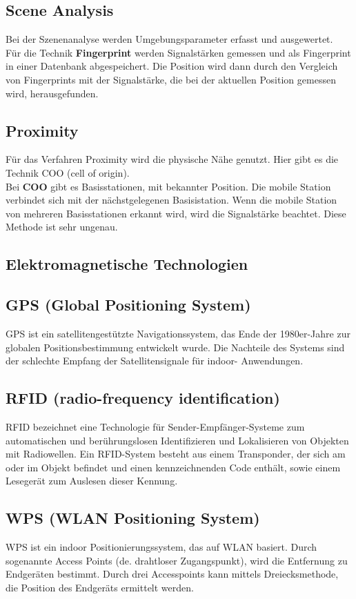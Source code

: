     \subsection*{Scene Analysis}
    Bei der Szenenanalyse werden Umgebungsparameter erfasst und ausgewertet.\\
    Für die Technik \textbf{Fingerprint} werden Signalstärken gemessen und als Fingerprint in einer Datenbank abgespeichert. Die Position wird dann durch den Vergleich von Fingerprints mit der Signalstärke, die bei der aktuellen Position gemessen wird, herausgefunden.
    \subsection*{Proximity}
    Für das Verfahren Proximity wird die physische Nähe genutzt.
    Hier gibt es die Technik COO (cell of origin). \\
    Bei \textbf{COO} gibt es Basisstationen, mit bekannter Position. Die mobile Station verbindet sich mit der nächstgelegenen Basisistation. Wenn die mobile Station von mehreren Basisstationen erkannt wird, wird die Signalstärke beachtet. Diese Methode ist sehr ungenau.
    \\ %

    \subsection{Elektromagnetische Technologien}
    \subsection*{GPS (Global Positioning System)}
    GPS ist ein satellitengestützte Navigationssystem, das Ende der 1980er-Jahre zur globalen Positionsbestimmung entwickelt wurde. Die Nachteile des Systems sind der schlechte Empfang der Satellitensignale für indoor- Anwendungen. 
    \subsection*{RFID (radio-frequency identification)}
    RFID bezeichnet eine Technologie für Sender-Empfänger-Systeme zum automatischen und berührungslosen Identifizieren und Lokalisieren von Objekten mit Radiowellen. Ein RFID-System besteht aus einem Transponder, der sich am oder im Objekt befindet und einen kennzeichnenden Code enthält, sowie einem Lesegerät zum Auslesen dieser Kennung. 
    \subsection*{WPS (WLAN Positioning System)}   
    WPS ist ein indoor Positionierungssystem, das auf WLAN basiert. Durch sogenannte  Access Points (de. drahtloser Zugangspunkt), wird die Entfernung zu Endgeräten bestimmt. Durch drei Accesspoints kann mittels Dreiecksmethode, die Position des Endgeräts ermittelt werden.

